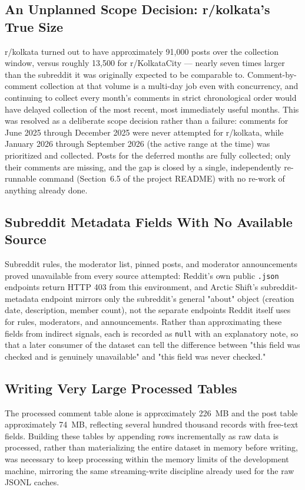 \documentclass[12pt]{article}
\begin{document}
\subsection{An Unplanned Scope Decision: r/kolkata's True Size}
r/kolkata turned out to have approximately 91,000 posts over the collection window, versus
roughly 13,500 for r/KolkataCity — nearly seven times larger than the subreddit it was originally
expected to be comparable to. Comment-by-comment collection at that volume is a multi-day job
even with concurrency, and continuing to collect every month's comments in strict chronological
order would have delayed collection of the most recent, most immediately useful months. This was
resolved as a deliberate scope decision rather than a failure: comments for June 2025 through
December 2025 were never attempted for r/kolkata, while January 2026 through September 2026 (the
active range at the time) was prioritized and collected. Posts for the deferred months are fully
collected; only their comments are missing, and the gap is closed by a single, independently
re-runnable command (Section~6.5 of the project README) with no re-work of anything already done.

\subsection{Subreddit Metadata Fields With No Available Source}
Subreddit rules, the moderator list, pinned posts, and moderator announcements proved
unavailable from every source attempted: Reddit's own public \texttt{.json} endpoints return
HTTP 403 from this environment, and Arctic Shift's subreddit-metadata endpoint mirrors only the
subreddit's general "about" object (creation date, description, member count), not the separate
endpoints Reddit itself uses for rules, moderators, and announcements. Rather than approximating
these fields from indirect signals, each is recorded as \texttt{null} with an explanatory note,
so that a later consumer of the dataset can tell the difference between "this field was checked
and is genuinely unavailable" and "this field was never checked."

\subsection{Writing Very Large Processed Tables}
The processed comment table alone is approximately 226~MB and the post table approximately
74~MB, reflecting several hundred thousand records with free-text fields. Building these tables
by appending rows incrementally as raw data is processed, rather than materializing the entire
dataset in memory before writing, was necessary to keep processing within the memory limits of
the development machine, mirroring the same streaming-write discipline already used for the raw
JSONL caches.
\end{document}

